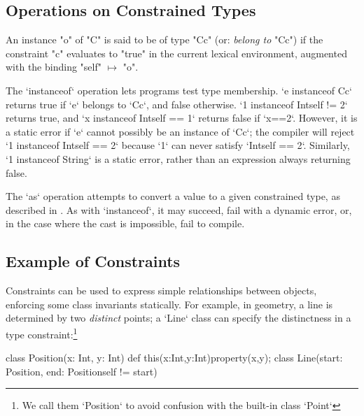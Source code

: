 {{\subsection{Operations on Constrained Types}

An instance \xcd"o" of \xcd"C" is said to be of type \xcd"C{c}" (or: {\em
belong to} \xcd"C{c}") if the constraint \xcd"c" evaluates to \xcd"true" in
the current lexical environment, augmented with the binding \xcd"self"
$\mapsto$ \xcd"o".

The \xcd`instanceof` operation lets programs test type membership.  
\xcd`e instanceof C{c}` returns true if \xcd`e` belongs to \xcd`C{c}`, and
false otherwise.  
\xcd`1 instanceof Int{self != 2}` returns true, 
and 
\xcd`x instanceof Int{self == 1}` returns false if 
\xcd`x==2`.
However, it is a static error if \xcd`e` cannot possibly be an instance of \xcd`C{c}`; 
the compiler will reject \xcd`1 instanceof Int{self == 2}` because \xcd`1` can
never satisfy \xcd`Int{self == 2}`.  Similarly, \xcd`1 instanceof String` is a
static error, rather than an expression always returning false. 


The \xcd`as` operation attempts to convert a value to a given constrained
type, as described in .   As with \xcd`instanceof`, it may
succeed, fail with a dynamic error, or, in the case where the cast is
impossible, fail to compile.


\subsection{Example of Constraints}

\begin{example}

Constraints can be used to express simple relationships between objects,
enforcing some class invariants statically.  For example, in geometry, a line
is determined by two {\em distinct} points; a \xcd`Line` class can specify the
distinctness in a type constraint:\footnote{We call them
\xcd`Position` to avoid confusion with the built-in class \xcd`Point`}

% 
\begin{xten}
class Position(x: Int, y: Int) {
   def this(x:Int,y:Int){property(x,y);}
   }
class Line(start: Position, 
           end: Position{self != start}) {}
\end{xten}


\end{example}}}
